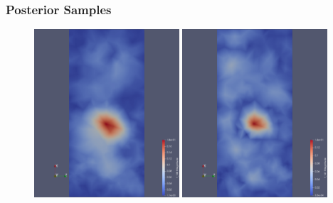 \documentclass[
  pdf,
  10pt,
  xcolor={svgnames},
]{beamer}
\begin{document}
\begin{frame}
  \frametitle{Posterior Samples}
  \begin{figure}
    \centering
    \includegraphics[width=0.48\textwidth]{./resources/post_sample_1}
    \includegraphics[width=0.48\textwidth]{./resources/post_sample_2}
  \end{figure}
\end{frame}

\end{document}
